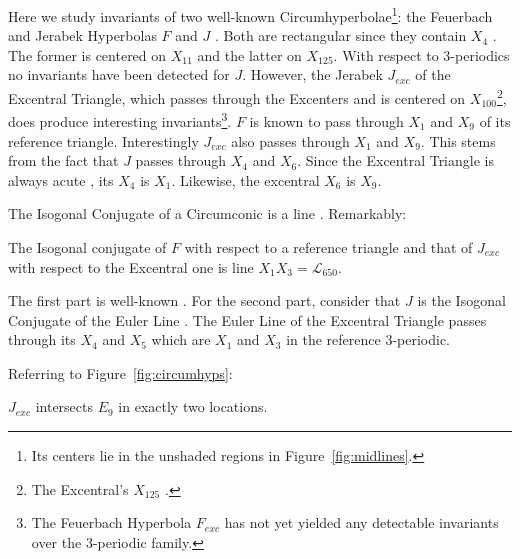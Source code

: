 
Here we study invariants of two well-known Circumhyperbolae\footnote{Its centers lie in the unshaded regions in Figure~\ref{fig:midlines}.}: the Feuerbach and Jerabek Hyperbolas $F$ and $J$ \cite[Jerabek Hyperbola]{mw}. Both are rectangular since they contain $X_4$ \cite{mw}. The former is centered on $X_{11}$ and the latter on $X_{125}$. With respect to 3-periodics no invariants have been detected for $J$. However, the Jerabek $J_{exc}$ of the Excentral Triangle, which passes through the Excenters and is centered on $X_{100}$\footnote{The Excentral's $X_{125}$ \cite{mw}.}, does produce interesting invariants\footnote{The Feuerbach Hyperbola $F_{exc}$ has not yet yielded any detectable invariants over the 3-periodic family.}. 
$F$ is known to pass through $X_1$ and $X_9$ of its reference triangle. Interestingly
$J_{exc}$ also passes through $X_1$ and $X_9$. This stems from the fact that $J$ passes through $X_4$ and $X_6$. Since the Excentral Triangle is always acute \cite{coxeter67}, its $X_4$ is $X_1$. Likewise, the excentral $X_6$ is $X_9$. 

The Isogonal Conjugate of a Circumconic is a line \cite[Circumconic]{mw}. Remarkably:

\begin{remark}
The Isogonal conjugate of $F$ with respect to a reference triangle and that of $J_{exc}$ with respect to the Excentral one is line $X_1X_3=\mathcal{L}_{650}$.
\end{remark}

The first part is well-known \cite[Feuerbach Hyperbola]{mw}. For the second part, consider that $J$ is the Isogonal Conjugate of the Euler Line \cite[Jerabek Hyperbola]{mw}. The Euler Line of the Excentral Triangle passes through its $X_4$ and $X_5$ which are $X_1$ and $X_3$ in the reference 3-periodic.

Referring to Figure~\ref{fig:circumhyps}:

\begin{proposition}
$J_{exc}$ intersects $E_9$ in exactly two locations.
\end{proposition}


